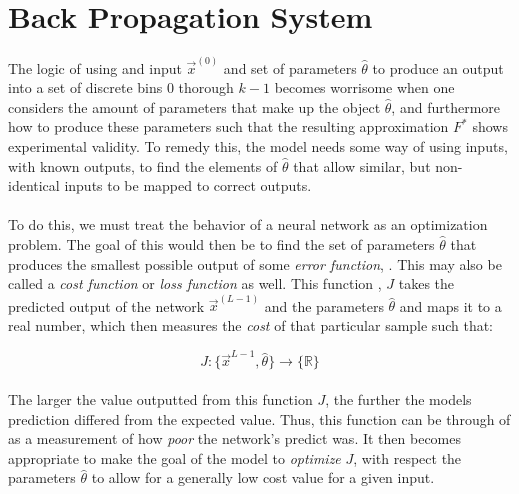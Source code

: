 \documentclass[12pt,letterpaper]{article}
\begin{document}

\section*{Back Propagation System}

\paragraph*{}The logic of using and input $\vec{x}^{(0)}$ and set of parameters $\hat{\theta}$ to produce an output into a set of discrete bins $0$ thorough $k-1$ becomes worrisome when one considers the amount of parameters that make up the object $\hat{\theta}$, and furthermore how to produce these parameters such that the resulting approximation $F^*$ shows experimental validity. To remedy this, the model needs some way of using inputs, with known outputs, to find the elements of $\hat{\theta}$ that allow similar, but non-identical inputs to be mapped to correct outputs.

\paragraph*{}To do this, we must treat the behavior of a neural network as an optimization problem. The goal of this would then be to find the set of parameters $\hat{\theta}$ that produces the smallest possible output of some \textit{error function}, \cite{Goodfellow,James,Loy}. This may also be called a \textit{cost function} or \textit{loss function} as well. This function , $J$ takes the predicted output of the network $\vec{x}^{(L-1)}$ and the parameters $\hat{\theta}$ and maps it to a real number, which then measures the \textit{cost} of that particular sample such that:

\begin{equation}
\label{cost func}
J : \big\{ \vec{x}^{L-1} , \hat{\theta} \big\} \rightarrow \big\{ \mathbb{R} \big\}
\end{equation}	

\paragraph*{}The larger the value outputted from this function $J$, the further the models prediction differed from the expected value. Thus, this function can be through of as a measurement of how \textit{poor} the network's predict was. It then becomes appropriate to make the goal of the model to \textit{optimize} $J$, with respect the parameters $\hat{\theta}$ to allow for a generally low cost value for a given input.
\end{document}
